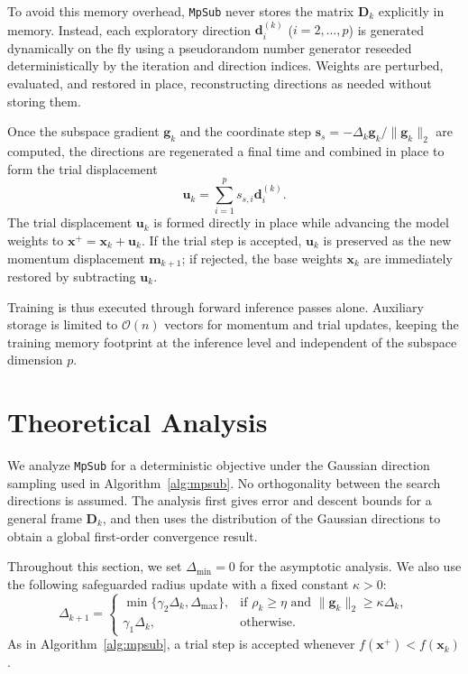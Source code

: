 \documentclass[smallextended]{svjour3}
\newcommand{\bx}{\bm{x}}
\newcommand{\bd}{\bm{d}}
\newcommand{\bg}{\bm{g}}
\newcommand{\bs}{\bm{s}}
\begin{document}
To avoid this memory overhead, \texttt{MpSub} never stores the matrix $\bm D_k$ explicitly in memory. Instead, each exploratory direction $\bd_i^{(k)}$ ($i = 2, \ldots, p$) is generated dynamically on the fly using a pseudorandom number generator reseeded deterministically by the iteration and direction indices. Weights are perturbed, evaluated, and restored in place, reconstructing directions as needed without storing them.

Once the subspace gradient $\bg_k$ and the coordinate step $\bs_s = -\Delta_k \bg_k / \|\bg_k\|_2$ are computed, the directions are regenerated a final time and combined in place to form the trial displacement
\begin{equation}
\bm u_k = \sum_{i=1}^p s_{s,i} \bd_i^{(k)}.
\label{eq:trial_displacement}
\end{equation}
The trial displacement $\bm u_k$ is formed directly in place while advancing the model weights to $\bx^+ = \bx_k + \bm u_k$. If the trial step is accepted, $\bm u_k$ is preserved as the new momentum displacement $\bm m_{k+1}$; if rejected, the base weights $\bx_k$ are immediately restored by subtracting $\bm u_k$.

Training is thus executed through forward inference passes alone. Auxiliary storage is limited to $\mathcal{O}(n)$ vectors for momentum and trial updates, keeping the training memory footprint at the inference level and independent of the subspace dimension $p$.

\section{Theoretical Analysis}
\label{sec:analysis}

We analyze \texttt{MpSub} for a deterministic objective under the Gaussian direction sampling used in Algorithm~\ref{alg:mpsub}. No orthogonality between the search directions is assumed. The analysis first gives error and descent bounds for a general frame $\bm D_k$, and then uses the distribution of the Gaussian directions to obtain a global first-order convergence result.

Throughout this section, we set $\Delta_{\min}=0$ for the asymptotic analysis. We also use the following safeguarded radius update with a fixed constant $\kappa>0$:
\begin{equation}
\label{eq:safeguarded_radius}
\Delta_{k+1} =
\begin{cases}
\min\{\gamma_2\Delta_k,\Delta_{\max}\}, & \text{if } \rho_k\ge\eta \text{ and } \|\bg_k\|_2\ge\kappa\Delta_k, \\
\gamma_1\Delta_k, & \text{otherwise}.
\end{cases}
\end{equation}
As in Algorithm~\ref{alg:mpsub}, a trial step is accepted whenever $f(\bx^+) < f(\bx_k)$.
\end{document}
